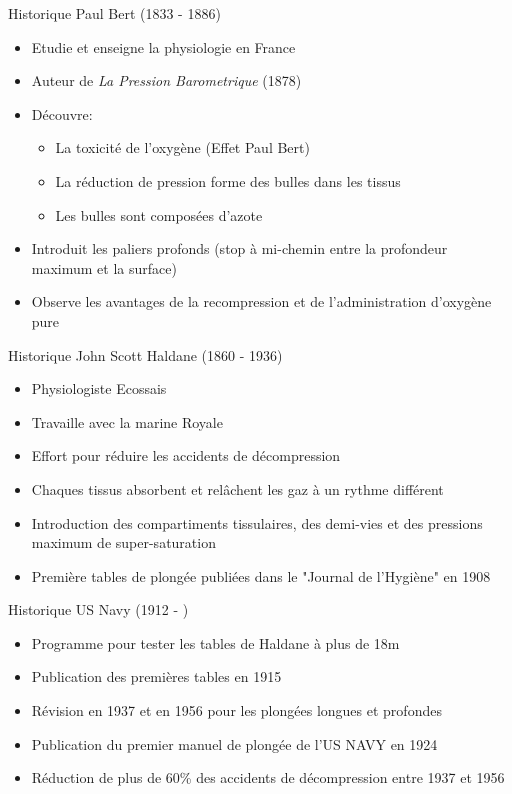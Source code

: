 \begin{frame}{Historique}  
	Paul Bert (1833 - 1886)
	\begin{itemize}
		\item Etudie et enseigne la physiologie en France
		\item Auteur de \textit{La Pression Barometrique} (1878)
		\item Découvre:
		\begin{itemize}
			\item La toxicité de l'oxygène (Effet Paul Bert)
			\item La réduction de pression forme des bulles dans les tissus
			\item Les bulles sont composées d'azote
		\end{itemize}
		\item Introduit les paliers profonds (stop à mi-chemin entre la profondeur maximum et la surface)
		\item Observe les avantages de la recompression et de l'administration d'oxygène pure
	\end{itemize}
\end{frame}

\begin{frame}{Historique}  
	John Scott Haldane (1860 - 1936)
	\begin{itemize}
		\item Physiologiste Ecossais
		\item Travaille avec la marine Royale
		\item Effort pour réduire les accidents de décompression
		\item Chaques tissus absorbent et relâchent les gaz à un rythme différent
		\item Introduction des compartiments tissulaires, des demi-vies et des pressions maximum de super-saturation
		\item Première tables de plongée publiées dans le "Journal de l'Hygiène" en 1908
	\end{itemize}
\end{frame}

\begin{frame}{Historique}  
	US Navy (1912 - )
	\begin{itemize}
		\item Programme pour tester les tables de Haldane à plus de 18m
		\item Publication des premières tables en 1915
		\item Révision en 1937 et en 1956 pour les plongées longues et profondes
		\item Publication du premier manuel de plongée de l'US NAVY en 1924
		\item Réduction de plus de 60\% des accidents de décompression entre 1937 et 1956
	\end{itemize}
\end{frame}

